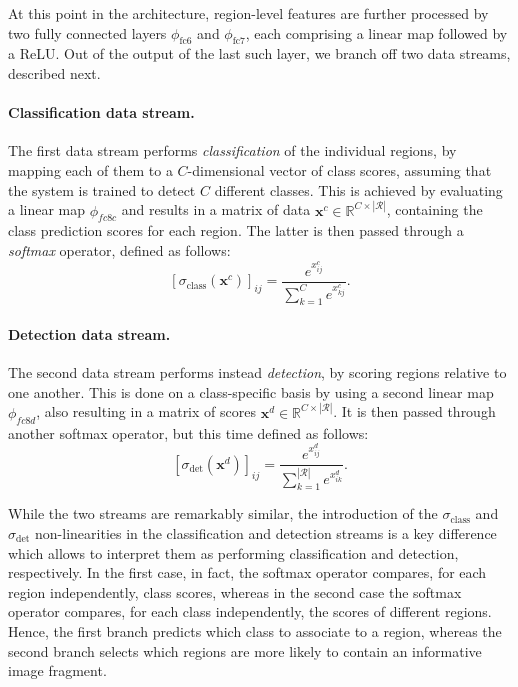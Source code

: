 \documentclass[10pt,twocolumn,letterpaper]{article}
\newcommand{\bx}{\mathbf{x}}
\begin{document}
At this point in the architecture, region-level features are further processed by two fully connected layers $\phi_\text{fc6}$ and $\phi_\text{fc7}$, each comprising a linear map followed by a ReLU. Out of the output of the last such layer, we branch off two data streams, described next.

\paragraph{Classification data stream.} The first data stream performs \emph{classification} of the individual regions, by mapping each of them to a $C$-dimensional vector of class scores, assuming that the system is trained to detect $C$ different classes. This is achieved by evaluating a linear map $\phi_{fc8c}$ and results in a matrix of data $\bx^c \in \mathbb{R}^{C \times |\mathcal{R}|}$, containing the class prediction scores for each region. The latter is then passed through a \emph{softmax} operator, defined as follows:
\begin{equation}\label{e:softmaxc}
  [\sigma_\text{class}(\bx^c)]_{ij}
  = 
  \frac{e^{x^c_{ij}}}{\sum_{k=1}^{C} e^{x^c_{kj}}}.
\end{equation}\paragraph{Detection data stream.} The second data stream performs instead \emph{detection}, by scoring regions relative to one another. This is done on a class-specific basis by using a second linear map $\phi_{fc8d}$, also resulting in a matrix of scores $\bx^d \in \mathbb{R}^{C \times |\mathcal{R}|}$. It is then passed through another softmax operator, but this time defined as follows:
\begin{equation}\label{e:softmaxd}
  [\sigma_\text{det}(\bx^d)]_{ij}
  = 
  \frac{e^{x^d_{ij}}}{\sum_{k=1}^{|\mathcal{R}|} e^{x^d_{ik}}}.
\end{equation}

While the two streams are remarkably similar, the introduction of the $\sigma_\text{class}$ and $\sigma_\text{det}$ non-linearities in the classification and detection streams is a key difference which allows to interpret them as performing classification and detection, respectively. In the first case, in fact, the softmax operator compares, for each region independently, class scores, whereas in the second case the softmax operator compares, for each class independently, the scores of different regions. Hence, the first branch predicts which class to associate to a region, whereas the second branch selects which regions are more likely to contain an informative image fragment.
\end{document}
